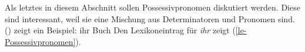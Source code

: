 Als letztes in diesem Abschnitt sollen Possessivpronomen diskutiert werden. Diese sind interessant,
weil sie eine Mischung aus Determinatoren und Pronomen sind. () zeigt ein Beispiel:
\ea
ihr Buch
\z
Den Lexikoneintrag für \emph{ihr} zeigt (\ref{le-Possessivpronomen}).
